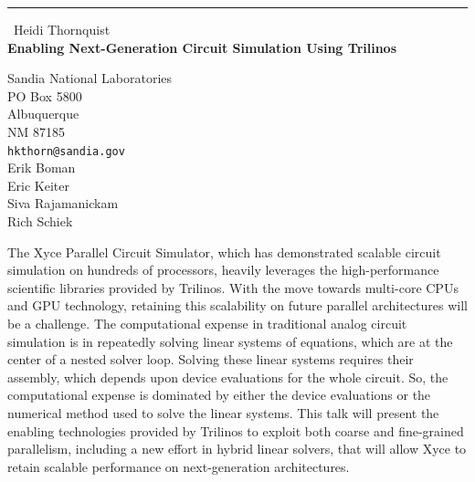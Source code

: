 \documentclass{report}
\begin{document}
\begin{center}
\rule{6in}{1pt} \
{\large Heidi Thornquist \\
{\bf Enabling Next-Generation Circuit Simulation Using Trilinos}}

Sandia National Laboratories \\ PO Box 5800 \\ Albuquerque \\ NM 87185
\\
{\tt hkthorn@sandia.gov}\\
Erik Boman\\
Eric Keiter\\
Siva Rajamanickam\\
Rich Schiek\end{center}

The Xyce Parallel Circuit Simulator, which has demonstrated scalable
circuit simulation on hundreds of processors, heavily leverages the
high-performance scientific libraries provided by Trilinos. With the move
towards multi-core CPUs and GPU technology, retaining this scalability on
future parallel architectures will be a challenge. The computational
expense in traditional analog circuit simulation is in repeatedly solving
linear systems of equations, which are at the center of a nested solver
loop. Solving these linear systems requires their assembly, which depends
upon device evaluations for the whole circuit. So, the computational
expense is dominated by either the device evaluations or the numerical
method used to solve the linear systems. This talk will present the
enabling technologies provided by Trilinos to exploit both coarse and
fine-grained parallelism, including a new effort in hybrid linear
solvers, that will allow Xyce to retain scalable performance on
next-generation architectures.
\end{document}
